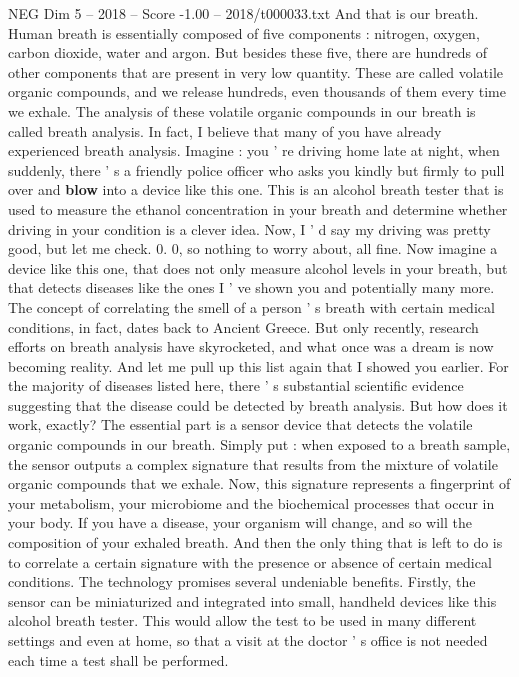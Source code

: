 \begin{textsample}{NEG Dim 5 – 2018 – Score -1.00 – 2018/t000033.txt}
And that is our breath.
Human breath is essentially composed of five components : nitrogen, oxygen, carbon dioxide, water and argon.
But besides these five, there are hundreds of other components that are present in very low quantity.
These are called volatile organic compounds, and we release hundreds, even thousands of them every time we exhale.
The analysis of these volatile organic compounds in our breath is called breath analysis.
In fact, I believe that many of you have already experienced breath analysis.
Imagine : you ' re driving home late at night, when suddenly, there ' s a friendly police officer who asks you kindly but firmly to pull over and \textbf{blow} into a device like this one.
This is an alcohol breath tester that is used to measure the ethanol concentration in your breath and determine whether driving in your condition is a clever idea.
Now, I ' d say my driving was pretty good, but let me check. 0. 0, so nothing to worry about, all fine.
Now imagine a device like this one, that does not only measure alcohol levels in your breath, but that detects diseases like the ones I ' ve shown you and potentially many more.
The concept of correlating the smell of a person ' s breath with certain medical conditions, in fact, dates back to Ancient Greece.
But only recently, research efforts on breath analysis have skyrocketed, and what once was a dream is now becoming reality.
And let me pull up this list again that I showed you earlier.
For the majority of diseases listed here, there ' s substantial scientific evidence suggesting that the disease could be detected by breath analysis.
But how does it work, exactly?
The essential part is a sensor device that detects the volatile organic compounds in our breath.
Simply put : when exposed to a breath sample, the sensor outputs a complex signature that results from the mixture of volatile organic compounds that we exhale.
Now, this signature represents a fingerprint of your metabolism, your microbiome and the biochemical processes that occur in your body.
If you have a disease, your organism will change, and so will the composition of your exhaled breath.
And then the only thing that is left to do is to correlate a certain signature with the presence or absence of certain medical conditions.
The technology promises several undeniable benefits.
Firstly, the sensor can be miniaturized and integrated into small, handheld devices like this alcohol breath tester.
This would allow the test to be used in many different settings and even at home, so that a visit at the doctor ' s office is not needed each time a test shall be performed.

\end{textsample}
